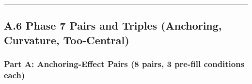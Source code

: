 \begin{center}\rule{0.5\linewidth}{0.5pt}\end{center}

\subsection{A.6 Phase 7 Pairs and Triples (Anchoring, Curvature, Too-Central)}\label{a.6-phase-7-pairs-and-triples-anchoring-curvature-too-central}

\subsubsection{Part A: Anchoring-Effect Pairs (8 pairs, 3 pre-fill conditions each)}\label{part-a-anchoring-effect-pairs-8-pairs-3-pre-fill-conditions-each}

